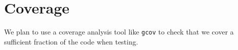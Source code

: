 %
%
\section{Coverage}
\label{sec:coverage}

We plan to use a coverage analysis tool like \texttt{gcov} to check that we cover a sufficient fraction of the code when testing.




%
%
